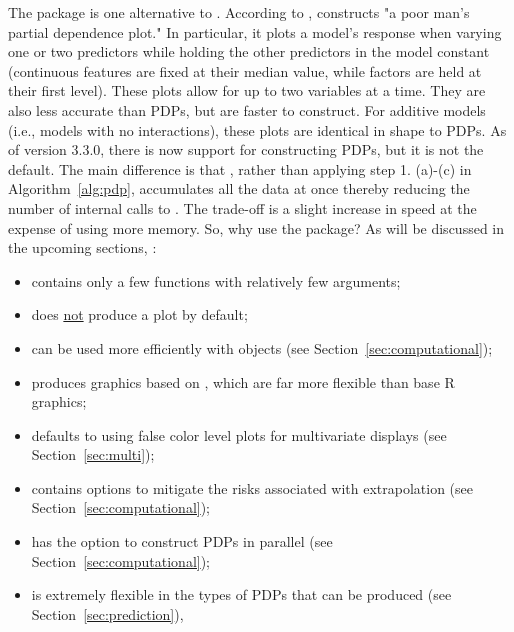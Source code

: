 The  package \citep{plotmo-pkg} is one alternative to . According to \citeauthor{plotmo-pkg},  constructs "a poor man's partial dependence plot." In particular, it plots a model's response when varying one or two predictors while holding the other predictors in the model constant (continuous features are fixed at their median value, while factors are held at their first level). These plots allow for up to two variables at a time. They are also less accurate than PDPs, but are faster to construct. For additive models (i.e., models with no interactions), these plots are identical in shape to PDPs. As of  version 3.3.0, there is now support for constructing PDPs, but it is not the default. The main difference is that , rather than applying step 1. (a)-(c) in Algorithm~\ref{alg:pdp}, accumulates all the data at once thereby reducing the number of internal calls to . The trade-off is a slight increase in speed at the expense of using more memory. So, why use the  package? As will be discussed in the upcoming sections, :
\begin{itemize}
  \item contains only a few functions with relatively few arguments;
  \item does \underline{not} produce a plot by default;
  \item can be used more efficiently with  objects (see Section~\ref{sec:computational});
  \item produces graphics based on  \citep{lattice-pkg}, which are far more flexible than base R graphics;
  \item defaults to using false color level plots for multivariate displays (see Section~\ref{sec:multi});
  \item contains options to mitigate the risks associated with extrapolation (see Section~\ref{sec:computational});
  \item has the option to construct PDPs in parallel (see Section~\ref{sec:computational});
    \item is extremely flexible in the types of PDPs that can be produced (see Section~\ref{sec:prediction}),
\end{itemize}

